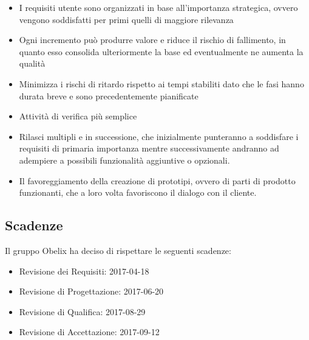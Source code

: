 \begin{itemize}
\item I requisiti utente sono organizzati in base all'importanza strategica, ovvero vengono soddisfatti per primi quelli di maggiore rilevanza
\item Ogni incremento può produrre valore e riduce il rischio di fallimento, in quanto esso
consolida ulteriormente la base ed eventualmente ne aumenta la qualità
\item Minimizza i rischi di ritardo rispetto ai tempi stabiliti dato che le fasi hanno durata breve e sono precedentemente pianificate
\item Attività di verifica più semplice
\item Rilasci multipli e in successione, che inizialmente punteranno a soddisfare i requisiti di primaria importanza mentre successivamente andranno ad adempiere a possibili funzionalità aggiuntive o opzionali.
\item Il favoreggiamento della creazione di prototipi, ovvero di parti di prodotto funzionanti, che a loro volta favoriscono
il dialogo con il cliente.

\end{itemize}



\subsection{Scadenze}

Il gruppo Obelix ha deciso di rispettare le seguenti scadenze:

\begin{itemize}

\item Revisione dei Requisiti: 2017-04-18
\item Revisione di Progettazione: 2017-06-20
\item Revisione di Qualifica: 2017-08-29
\item Revisione di Accettazione: 2017-09-12

\end{itemize}

